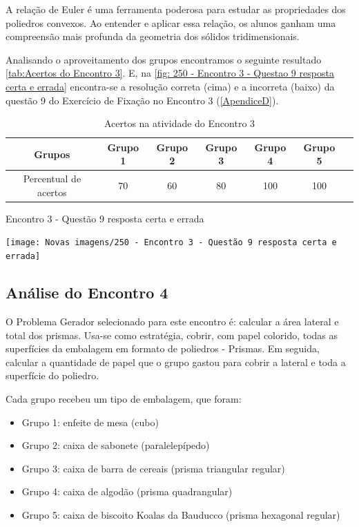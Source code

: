 A relação de Euler é uma ferramenta poderosa para estudar as propriedades dos poliedros convexos. Ao entender e aplicar essa relação, os alunos ganham uma compreensão mais profunda da geometria dos sólidos tridimensionais.

Analisando o aproveitamento dos grupos encontramos o seguinte resultado \autoref{tab:Acertos do Encontro 3}. E, na \autoref{fig: 250 - Encontro 3 - Questao 9 resposta certa e errada} encontra-se a resolução correta (cima) e a incorreta (baixo) da questão 9 do Exercício de Fixação no Encontro 3 (\autoref{ApendiceD}).

\begin{table}[htbp] \centering
    \caption{Acertos na atividade do Encontro 3} \label{tab:Acertos do Encontro 3}
    \begin{tabular}{|c|c|c|c|c|c|c|}
        \hline
        \textbf{Grupos}       & \textbf{Grupo 1} & \textbf{Grupo 2} & \textbf{Grupo 3} & \textbf{Grupo 4} & \textbf{Grupo 5} \\
        \hline
        Percentual de acertos & 70               & 60               & 80               & 100              & 100              \\
        \hline
    \end{tabular}
    \legend{\legendaTabela}
\end{table}

\begin{CenteredFigure}
    \caption{Encontro 3 - Questão 9 resposta certa e errada} \label{fig: 250 - Encontro 3 - Questao 9 resposta certa e errada}
    \texttt{[image: Novas imagens/250 - Encontro 3 - Questão 9 resposta certa e errada]}
    \legend{\autoria}
\end{CenteredFigure}

\subsection{Análise do Encontro 4}

O Problema Gerador selecionado para este encontro é: calcular a área lateral e total dos prismas. Usa-se como estratégia, cobrir, com papel colorido, todas as superfícies da embalagem em formato de poliedros - Prismas. Em seguida, calcular a quantidade de papel que o grupo gastou para cobrir a lateral e toda a superfície do poliedro.

Cada grupo recebeu um tipo de embalagem, que foram:

\begin{itemize}
    \item Grupo 1: enfeite de mesa (cubo)
    \item Grupo 2: caixa de sabonete (paralelepípedo)
    \item Grupo 3: caixa de barra de cereais (prisma triangular regular)
    \item Grupo 4: caixa de algodão (prisma quadrangular)
    \item Grupo 5: caixa de biscoito Koalas da Bauducco (prisma hexagonal regular)
\end{itemize}

